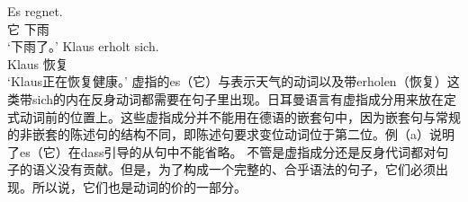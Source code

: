 \eal
\ex\label{Beispiel-es-regnet}
\gll Es regnet.\\
     它 下雨\\
\glt `下雨了。'
\ex\label{Beispiel-erholt-sich}
\gll Klaus erholt sich.\\
     Klaus 恢复 \\
\glt `Klaus正在恢复健康。'
\zl
虚指的es（它）与表示天气的动词以及带erholen（恢复）这类带sich的内在反身动词都需要在句子里出现。日耳曼语言有虚指成分用来放在定式动词前的位置上。这些虚指成分并不能用在德语的嵌套句中，因为嵌套句与常规的非嵌套的陈述句的结构不同，即陈述句要求变位动词位于第二位。例（a）说明了es（它）在dass引导的从句中不能省略。
\eal
{}
\zl
不管是虚指成分还是反身代词都对句子的语义没有贡献。但是，为了构成一个完整的、合乎语法的句子，它们必须出现。所以说，它们也是动词的价的一部分。

